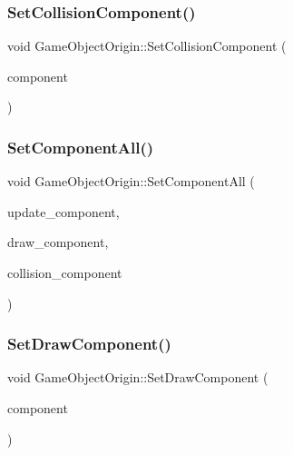 \subsubsection{\texorpdfstring{Set\+Collision\+Component()}{SetCollisionComponent()}}
{\footnotesize\ttfamily void Game\+Object\+Origin\+::\+Set\+Collision\+Component (\begin{DoxyParamCaption}\item[{\mbox{\hyperlink{class_collision_component}{Collision\+Component}} $\ast$}]{component }\end{DoxyParamCaption})\hspace{0.3cm}{\ttfamily [inline]}}

\mbox{\label{class_game_object_origin_a6dc8d3becc806dd6cf89663af981127e}} 
\subsubsection{\texorpdfstring{Set\+Component\+All()}{SetComponentAll()}}
{\footnotesize\ttfamily void Game\+Object\+Origin\+::\+Set\+Component\+All (\begin{DoxyParamCaption}\item[{\mbox{\hyperlink{class_update_component}{Update\+Component}} $\ast$}]{update\+\_\+component,  }\item[{\mbox{\hyperlink{class_draw_component}{Draw\+Component}} $\ast$}]{draw\+\_\+component,  }\item[{\mbox{\hyperlink{class_collision_component}{Collision\+Component}} $\ast$}]{collision\+\_\+component }\end{DoxyParamCaption})\hspace{0.3cm}{\ttfamily [inline]}}

\mbox{\label{class_game_object_origin_a525d9ecb39e10295bda324afbefbcc74}} 
\subsubsection{\texorpdfstring{Set\+Draw\+Component()}{SetDrawComponent()}}
{\footnotesize\ttfamily void Game\+Object\+Origin\+::\+Set\+Draw\+Component (\begin{DoxyParamCaption}\item[{\mbox{\hyperlink{class_draw_component}{Draw\+Component}} $\ast$}]{component }\end{DoxyParamCaption})\hspace{0.3cm}{\ttfamily [inline]}}

